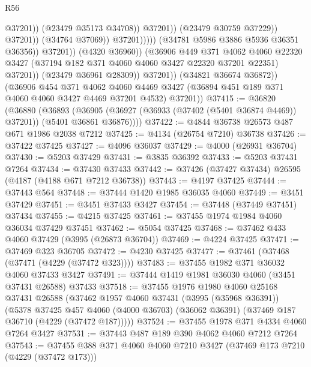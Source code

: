 \begin{lexlean}{R56}
\begin{coremodule}
                                                    @37201))
                                                (@23479 @35173 @34708))
                                              @37201))
                                          (@23479 @30759 @37229))
                                        @37201))
                                    (@34764 @37069))
                                  @37201)))))
                        (@34781 @5986 @3886 @5936 @36351 @36356))
                      @37201))
                  (@4320 @36960))
                (@36906
                  @449
                  @371
                  @4062
                  @4060
                  @22320
                  @3427
                  (@37194 @182 @371 @4060 @4060 @3427 @22320 @37201 @22351)
                  @37201))
              (@23479 @36961 @28309))
            @37201))
        (@34821 @36674 @36872))
      (@36906
        @454
        @371
        @4062
        @4060
        @4469
        @3427
        (@36894 @451 @189 @371 @4060 @4060 @3427 @4469 @37201 @4532)
        @37201))
@37415 := @36820
    (@36880
      (@36893
        (@36905 (@36927 (@36933 (@37402 (@5401 @36874 @4469)) @37201)) (@5401 @36861 @36876))))
@37422 := @4844 @36738 @26573 @487 @671 @1986 @2038 @7212
@37425 := @4134 (@26754 @7210) @36738
@37426 := @37422 @37425
@37427 := @4096 @36037
@37429 := @4000 (@26931 @36704)
@37430 := @5203 @37429
@37431 := @3835 @36392
@37433 := @5203 @37431 @7264
@37434 := @37430 @37433
@37442 := @37426 (@37427 @37434) @26595 (@4187 (@4188 @671 @7212 @36738))
@37443 := @4197 @37425
@37444 := @37443 @564
@37448 := @37444 @1420 @1985 @36035 @4060
@37449 := @3451 @37429
@37451 := @3451 @37433 @3427
@37454 := @37448 (@37449 @37451) @37434
@37455 := @4215 @37425
@37461 := @37455 @1974 @1984 @4060 @36034 @37429 @37451
@37462 := @5054 @37425
@37468 := @37462 @433 @4060 @37429 (@3995 (@26873 @36704))
@37469 := @4224 @37425
@37471 := @37469 @323 @36705
@37472 := @4230 @37425
@37477 := @37461 (@37468 (@37471 (@4229 (@37472 @323))))
@37483 := @37455 @1982 @371 @36032 @4060 @37433 @3427
@37491 := @37444 @1419 @1981 @36030 @4060 (@3451 @37431 @26588) @37433
@37518 := @37455
    @1976
    @1980
    @4060
    @25168
    @37431
    @26588
    (@37462
      @1957
      @4060
      @37431
      (@3995 (@35968 @36391))
      (@5378
        @37425
        @457
        @4060
        (@4000 @36703)
        (@36062 @36391)
        (@37469 @187 @36710 (@4229 (@37472 @187)))))
@37524 := @37455 @1978 @371 @4334 @4060 @7264 @3427
@37531 := @37443 @487 @189 @390 @4062 @4060 @7212 @7264
@37543 := @37455 @388 @371 @4060 @4060 @7210 @3427 (@37469 @173 @7210 (@4229 (@37472 @173)))

\end{coremodule}
\end{lexlean}
